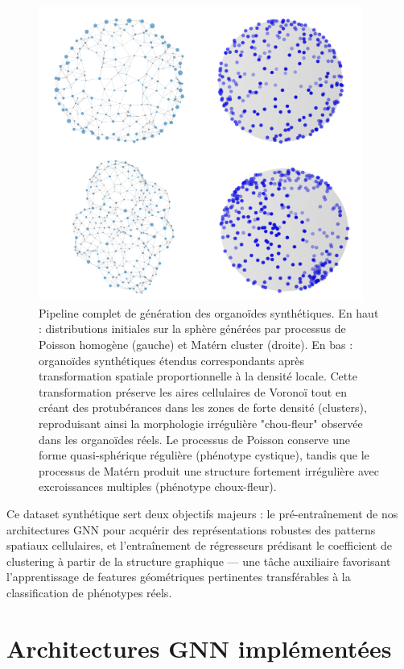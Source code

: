 \begin{figure}[htbp]
    \centering
    \includegraphics[width=0.95\textwidth]{../img/Modelisation.png}
    \caption{Pipeline complet de génération des organoïdes synthétiques. En haut : distributions initiales sur la sphère générées par processus de Poisson homogène (gauche) et Matérn cluster (droite). En bas : organoïdes synthétiques étendus correspondants après transformation spatiale proportionnelle à la densité locale. Cette transformation préserve les aires cellulaires de Voronoï tout en créant des protubérances dans les zones de forte densité (clusters), reproduisant ainsi la morphologie irrégulière "chou-fleur" observée dans les organoïdes réels. Le processus de Poisson conserve une forme quasi-sphérique régulière (phénotype cystique), tandis que le processus de Matérn produit une structure fortement irrégulière avec excroissances multiples (phénotype choux-fleur).}
    \label{fig:modelisation}
\end{figure}

Ce dataset synthétique sert deux objectifs majeurs : le pré-entraînement de nos architectures GNN pour acquérir des représentations robustes des patterns spatiaux cellulaires, et l'entraînement de régresseurs prédisant le coefficient de clustering à partir de la structure graphique — une tâche auxiliaire favorisant l'apprentissage de features géométriques pertinentes transférables à la classification de phénotypes réels.

\section{Architectures GNN implémentées}

